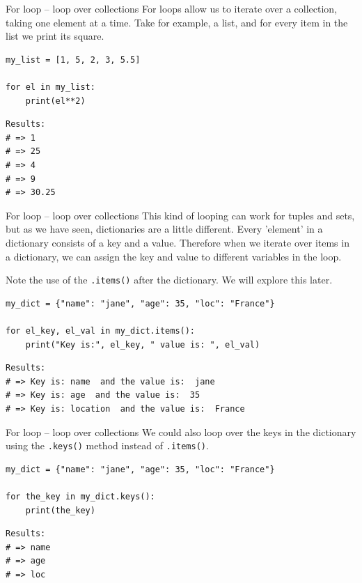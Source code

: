 \documentclass[10pt]{beamer}
\begin{document}
\begin{frame}[label={sec:org783067c},fragile]{For loop -- loop over collections}
 For loops allow us to iterate over a collection, taking one element at a time. Take
for example, a list, and for every item in the list we print its square.

\begin{verbatim}
my_list = [1, 5, 2, 3, 5.5]

for el in my_list:
    print(el**2)
\end{verbatim}

\begin{verbatim}
Results: 
# => 1
# => 25
# => 4
# => 9
# => 30.25
\end{verbatim}
\end{frame}

\begin{frame}[label={sec:orgc4151d9},fragile]{For loop -- loop over collections}
 This kind of looping can work for tuples and sets, but as we have seen, dictionaries
are a little different. Every 'element' in a dictionary consists of a key and a
value. Therefore when we iterate over items in a dictionary, we can assign the key
and value to different variables in the loop.

\alert{Note} the use of the \texttt{.items()} after the dictionary. We will explore this later.

\begin{verbatim}
my_dict = {"name": "jane", "age": 35, "loc": "France"}

for el_key, el_val in my_dict.items():
    print("Key is:", el_key, " value is: ", el_val)
\end{verbatim}

\begin{verbatim}
Results: 
# => Key is: name  and the value is:  jane
# => Key is: age  and the value is:  35
# => Key is: location  and the value is:  France
\end{verbatim}
\end{frame}

\begin{frame}[label={sec:org3c0841f},fragile]{For loop -- loop over collections}
 We could also loop over the keys in the dictionary using the \texttt{.keys()} method instead
of \texttt{.items()}.

\begin{verbatim}
my_dict = {"name": "jane", "age": 35, "loc": "France"}

for the_key in my_dict.keys():
    print(the_key)
\end{verbatim}

\begin{verbatim}
Results: 
# => name
# => age
# => loc
\end{verbatim}
\end{frame}
\end{document}
